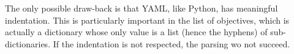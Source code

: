 The only possible draw-back is that YAML, like Python, has meaningful indentation. This is particularly important in the list of objectives, which is actually a dictionary whose only value is a list (hence the hyphens) of sub-dictionaries. If the indentation is not respected, the parsing wo not succeed.

